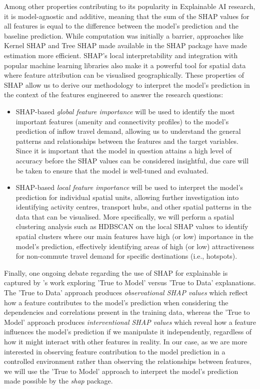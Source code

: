 Among other properties contributing to its popularity in Explainable AI research, it is model-agnostic and additive, meaning that the sum of the SHAP values for all features is equal to the difference between the model's prediction and the baseline prediction. While computation was initially a barrier, approaches like Kernel SHAP and Tree SHAP made available in the SHAP package have made estimation more efficient. SHAP's local interpretability and integration with popular machine learning libraries also make it a powerful tool for spatial data where feature attribution can be visualised geographically. These properties of SHAP allow us to derive our methodology to interpret the model's prediction in the context of the features engineered to answer the research questions:

\begin{itemize}
\setlength\itemsep{0em} 
    \item SHAP-based \textit{global feature importance} will be used to identify the most important features (amenity and connectivity profiles) to the model's prediction of inflow travel demand, allowing us to understand the general patterns and relationships between the features and the target variables. Since it is important that the model in question attains a high level of accuracy before the SHAP values can be considered insightful, due care will be taken to ensure that the model is well-tuned and evaluated.
    \item SHAP-based \textit{local feature importance} will be used to interpret the model's prediction for individual spatial units, allowing further investigation into identifying activity centres, transport hubs, and other spatial patterns in the data that can be visualised. More specifically, we will perform a spatial clustering analysis such as HDBSCAN on the local SHAP values to identify spatial clusters where our main features have high (or low) importance in the model's prediction, effectively identifying areas of high (or low) attractiveness for non-commute travel demand for specific destinations (i.e., hotspots).
\end{itemize}

Finally, one ongoing debate regarding the use of SHAP for explainable is captured by \citet{chenTrueModelTrue2020}'s work exploring 'True to Model' versus 'True to Data' explanations. The 'True to Data' approach produces \textit{observational SHAP values} which reflect how a feature contributes to the model's prediction when considering the dependencies and correlations present in the training data, whereas the 'True to Model' approach produces \textit{interventional SHAP values} which reveal how a feature influences the model's prediction if we manipulate it independently, regardless of how it might interact with other features in reality. In our case, as we are more interested in observing feature contribution to the model prediction in a controlled environment rather than observing the relationships between features, we will use the 'True to Model' approach to interpret the model's prediction made possible by the \textit{shap} package.


